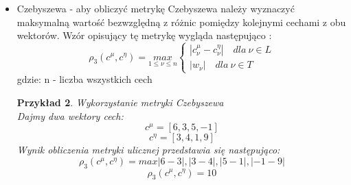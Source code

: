\documentclass{classrep}
\newtheorem{exmp}{Przykład}[section]
\begin{document}
\begin{itemize}
\begin{exmp}
        Dajmy dwa wektory cech:
        \begin{equation}
            c^\mu = [3, 5, 8]
        \end{equation}
        \begin{equation}
            c^\eta = [-2, 0, 10]
        \end{equation}
        Wynik obliczenia metryki ulicznej przedstawia się następująco:
        \begin{equation}
            \rho_{2}(c^\mu, c^\eta) = |3 - (-2)| + |5 - 0| + |8 - 10| 
        \end{equation}
        \begin{equation}
            \rho_{2}(c^\mu, c^\eta) = 12
        \end{equation} \\
    \end{exmp}
    \item Czebyszewa - aby obliczyć metrykę Czebyszewa należy wyznaczyć maksymalną wartość bezwzględną z różnic pomiędzy kolejnymi cechami z obu wektorów. Wzór opisujący tę metrykę wygląda następująco \cite{tadeusiewicz90}:
    \begin{equation}
    \label{eqn:czebyszew}
       \rho_3(c^\mu, c^\eta)= \underset{1\leq \nu \leq n}{max}\left\{\begin{matrix} \left | c_{\nu}^\mu - c_{\nu}^\eta \right | \quad dla \: \nu \in L \\ \left | w_{\nu} \right | \quad dla \: \nu \in T \end{matrix}\right.
    \end{equation}
    gdzie: n - liczba wszystkich cech
    \begin{exmp} Wykorzystanie metryki Czebyszewa  \\
        Dajmy dwa wektory cech:
        \begin{equation}
            c^\mu = [6, 3, 5, -1]
        \end{equation}
        \begin{equation}
            c^\eta = [3, 4, 1, 9]
        \end{equation}
        Wynik obliczenia metryki ulicznej przedstawia się następująco:
        \begin{equation}
            \rho_{3}(c^\mu, c^\eta) = max{|6 - 3|, |3 - 4|, |5 - 1|, |-1 - 9|}
        \end{equation}
        \begin{equation}
            \rho_{3}(c^\mu, c^\eta) = 10
        \end{equation} \\
    \end{exmp}
\end{itemize}
\end{document}
